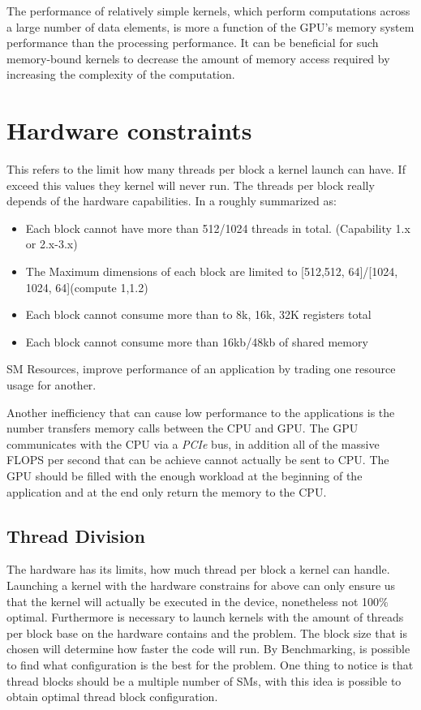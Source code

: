 The performance of relatively simple kernels, which perform computations across a large number of data elements, is more a function of the GPU's memory system performance than the processing performance. It can be beneficial for such memory-bound kernels to decrease the amount of memory access required by increasing the complexity of the computation. \cite{cook}

\section{Hardware constraints}

This refers to the limit how many threads per block a kernel launch can have. If exceed this values they kernel will never run. The threads per block really depends of the hardware capabilities. In a roughly summarized as:

\begin{itemize}
\item Each block cannot have more than 512/1024 threads in total. (Capability 1.x or 2.x-3.x)
\item The Maximum dimensions of each block are limited to [512,512, 64]/[1024, 1024, 64](compute 1,1.2)
\item Each block cannot consume more than to 8k, 16k, 32K registers total
\item Each block cannot consume more than 16kb/48kb of shared memory
\end{itemize}

SM Resources, improve performance of an application by trading one resource usage for another.  \cite{practices}

Another inefficiency that can cause low performance to the applications is the number transfers memory calls between the CPU and GPU. The GPU communicates with the CPU via a \textit{PCIe} bus, in addition all of the massive FLOPS per second that can be achieve cannot actually be sent to CPU. The GPU should be filled with the enough workload at the beginning of the application and at the end only return the memory to the CPU.

\subsection{Thread Division}

The hardware has its limits, how much thread per block a kernel can handle. Launching a kernel with the hardware constrains for above can only ensure us that the kernel will actually be executed in the device, nonetheless not 100$\%$ optimal. Furthermore is necessary to launch kernels with the amount of threads per block base on the hardware contains and the problem. The block size that is chosen will determine how faster the code will run. By Benchmarking, is possible to find what configuration is the best for the problem. One thing to notice is that thread blocks should be a multiple number of SMs, with this idea is possible to obtain optimal thread block configuration.

